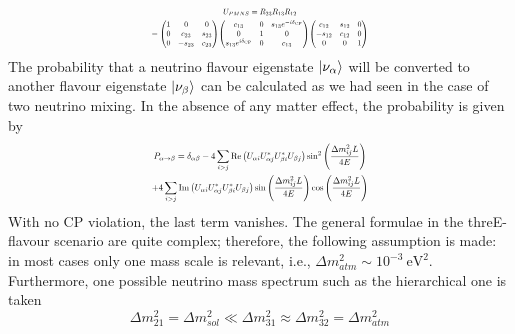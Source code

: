 \begin{equation}
\label{eq:upmns}
    \resizebox{0.45\textwidth}{!}{$\begin{gathered}
    U_{PMNS} =  R_{23}R_{13}R_{12} \\
    = {\begin{pmatrix}1&0&0\\0&c_{23}&s_{23}\\0&-s_{23}&c_{23}\end{pmatrix}}{\begin{pmatrix}c_{13}&0&s_{13}e^{-i\delta _{\mathrm {CP} }}\\0&1&0\\ s_{13}e^{i\delta _{\mathrm {CP} }}&0&c_{13}\end{pmatrix}}{\begin{pmatrix}c_{12}&s_{12}&0\\-s_{12}&c_{12}&0\\0&0&1\end{pmatrix}}
    \end{gathered}$}
\end{equation}
The probability that a neutrino flavour eigenstate \(\ket{\nu_\alpha}\) will be converted to another flavour eigenstate \(\ket{\nu _\beta}\) can be calculated as we had seen in the case of two neutrino mixing. In the absence of any matter effect, the probability is given by
\begin{equation}
    \resizebox{0.45\textwidth}{!}{$\begin{gathered}
        P_{\alpha \to \beta} = \delta_{\alpha\beta} - 4 \sum_{i > j} \mathrm{Re}\left(U_{\alpha i}U^* _{\alpha j}U^*_{\beta i}U _{\beta j}\right) \sin ^2 \left(\frac{\Delta m^2 _{ij} L}{4E} \right)\\
        + 4 \sum_{i > j} \mathrm{Im}\left(U_{\alpha i}U^* _{\alpha j}U^*_{\beta i}U _{\beta j}\right) \sin \left(\frac{\Delta m^2 _{ij} L}{4E} \right) \cos \left(\frac{\Delta m^2 _{ij} L}{4E} \right)
    \end{gathered}$}
\end{equation}
With no CP violation, the last term vanishes\cite{Dighe}. The general formulae in the threE-flavour scenario are quite complex; therefore, the following assumption is made: in most cases only one mass scale is relevant, i.e., \(\Delta m^2 _{atm} \sim 10^{-3}~\mathrm{eV}^2\). Furthermore, one possible neutrino mass spectrum such as the hierarchical one is taken\cite{zuber2020neutrino}
\begin{equation}
    \Delta m^2 _{21} = \Delta m^2 _{sol} \ll \Delta m^2 _{31} \approx \Delta m^2 _{32} = \Delta m^2 _{atm}
\end{equation}
